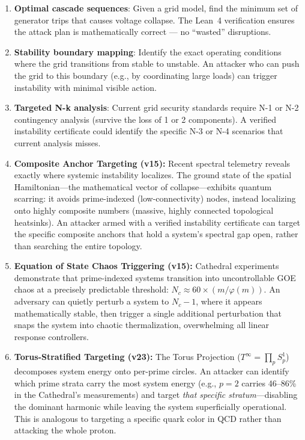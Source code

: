 \documentclass[11pt,a4paper]{article}
\begin{document}
\begin{enumerate}
  \item \textbf{Optimal cascade sequences}: Given a grid model,
    find the minimum set of generator trips that causes voltage
    collapse. The Lean~4 verification ensures the attack plan is
    mathematically correct --- no ``wasted'' disruptions.

  \item \textbf{Stability boundary mapping}: Identify the exact
    operating conditions where the grid transitions from stable to
    unstable. An attacker who can push the grid to this boundary
    (e.g., by coordinating large loads) can trigger instability with
    minimal visible action.

  \item \textbf{Targeted N-k analysis}: Current grid security
    standards require N-1 or N-2 contingency analysis (survive the
    loss of 1 or 2 components). A verified instability certificate
    could identify the specific N-3 or N-4 scenarios that current
    analysis misses.
  \item \textbf{Composite Anchor Targeting (v15):} Recent spectral
    telemetry reveals exactly where systemic instability localizes.
    The ground state of the spatial Hamiltonian---the mathematical
    vector of collapse---exhibits quantum scarring: it avoids
    prime-indexed (low-connectivity) nodes, instead localizing
    onto highly composite numbers (massive, highly connected
    topological heatsinks). An attacker armed with a verified
    instability certificate can target the specific composite
    anchors that hold a system's spectral gap open, rather than
    searching the entire topology.

  \item \textbf{Equation of State Chaos Triggering (v15):}
    Cathedral experiments demonstrate that prime-indexed systems
    transition into uncontrollable GOE chaos at a precisely
    predictable threshold: $N_c \approx 60 \times (m/\varphi(m))$.
    An adversary can quietly perturb a system to $N_c - 1$, where
    it appears mathematically stable, then trigger a single
    additional perturbation that snaps the system into chaotic
    thermalization, overwhelming all linear response controllers.

  \item \textbf{Torus-Stratified Targeting (v23):}
    The Torus Projection ($T^\infty = \prod_p S^1_p$) decomposes
    system energy onto per-prime circles. An attacker can identify
    which prime strata carry the most system energy (e.g., $p = 2$
    carries 46--86\% in the Cathedral's measurements) and
    target \emph{that specific stratum}---disabling the dominant
    harmonic while leaving the system superficially operational.
    This is analogous to targeting a specific quark color in QCD
    rather than attacking the whole proton.


\end{enumerate}
\end{document}
